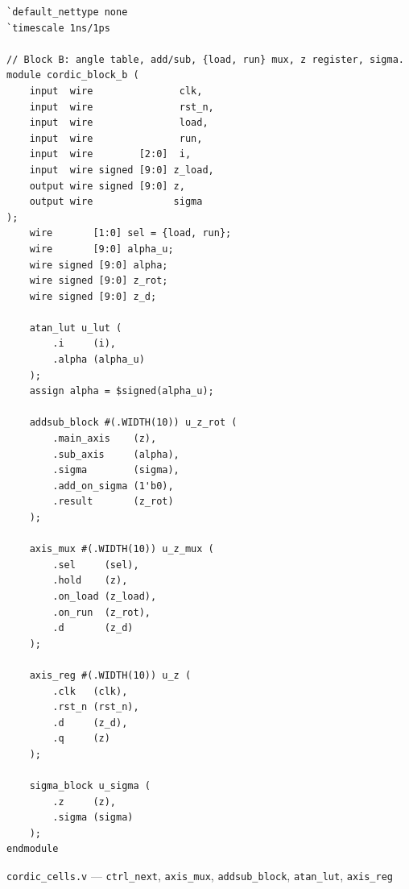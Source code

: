 \documentclass[12pt,a4paper]{article}
\begin{document}
\begin{verbatim}
`default_nettype none
`timescale 1ns/1ps

// Block B: angle table, add/sub, {load, run} mux, z register, sigma.
module cordic_block_b (
    input  wire               clk,
    input  wire               rst_n,
    input  wire               load,
    input  wire               run,
    input  wire        [2:0]  i,
    input  wire signed [9:0] z_load,
    output wire signed [9:0] z,
    output wire              sigma
);
    wire       [1:0] sel = {load, run};
    wire       [9:0] alpha_u;
    wire signed [9:0] alpha;
    wire signed [9:0] z_rot;
    wire signed [9:0] z_d;

    atan_lut u_lut (
        .i     (i),
        .alpha (alpha_u)
    );
    assign alpha = $signed(alpha_u);

    addsub_block #(.WIDTH(10)) u_z_rot (
        .main_axis    (z),
        .sub_axis     (alpha),
        .sigma        (sigma),
        .add_on_sigma (1'b0),
        .result       (z_rot)
    );

    axis_mux #(.WIDTH(10)) u_z_mux (
        .sel     (sel),
        .hold    (z),
        .on_load (z_load),
        .on_run  (z_rot),
        .d       (z_d)
    );

    axis_reg #(.WIDTH(10)) u_z (
        .clk   (clk),
        .rst_n (rst_n),
        .d     (z_d),
        .q     (z)
    );

    sigma_block u_sigma (
        .z     (z),
        .sigma (sigma)
    );
endmodule
\end{verbatim}

\noindent\texttt{cordic\_cells.v} — \texttt{ctrl\_next}, \texttt{axis\_mux}, \texttt{addsub\_block}, \texttt{atan\_lut}, \texttt{axis\_reg}
\end{document}
